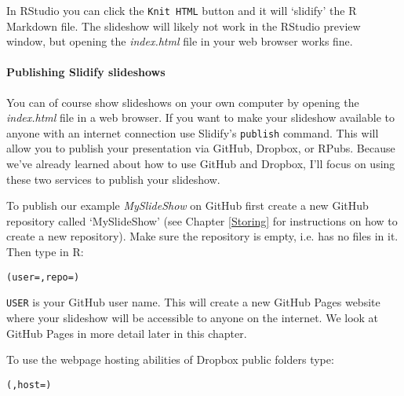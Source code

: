 \noindent In RStudio you can click the \texttt{Knit HTML} button and it will `slidify' the R Markdown file. The slideshow will likely not work in the RStudio preview window, but opening the \emph{index.html} file in your web browser works fine. 

\paragraph{Publishing Slidify slideshows}

You can of course show slideshows on your own computer by opening the \emph{index.html} file in a web browser. If you want to make your slideshow available to anyone with an internet connection use Slidify's \verb|publish| command. This will allow you to publish your presentation via GitHub, Dropbox, or RPubs. Because we've already learned about how to use GitHub and Dropbox, I'll focus on using these two services to publish your slideshow.

To publish our example \emph{MySlideShow} on GitHub first create a new GitHub repository called `MySlideShow' (see Chapter \ref{Storing} for instructions on how to create a new repository). Make sure the repository is empty, i.e. has no files in it. Then type in R:

\begin{knitrout}
\color{fgcolor}\begin{kframe}
\begin{alltt}
(user = , repo = )
\end{alltt}
\end{kframe}
\end{knitrout}


\noindent \texttt{USER} is your GitHub user name. This will create a new GitHub Pages website where your slideshow will be accessible to anyone on the internet. We look at GitHub Pages in more detail later in this chapter.

To use the webpage hosting abilities of Dropbox public folders type:

\begin{knitrout}
\color{fgcolor}\begin{kframe}
\begin{alltt}
(, host = )
\end{alltt}
\end{kframe}
\end{knitrout}


